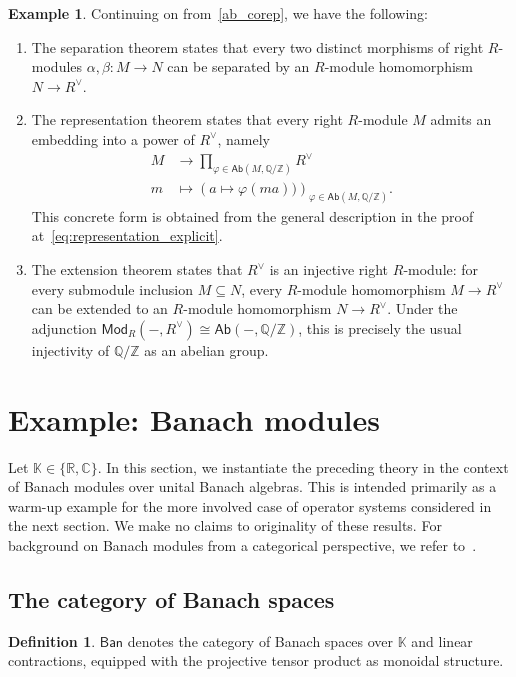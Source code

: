 \documentclass[11pt,onecolumn]{article}
\newcommand{\R}{\mathbb{R}}
\newcommand{\Z}{\mathbb{Z}}
\newcommand{\Q}{\mathbb{Q}}
\newcommand{\C}{\mathbb{C}}
\newcommand{\K}{\mathbb{K}}
\newcommand{\Ab}{\mathsf{Ab}}
\newcommand{\Ban}{\mathsf{Ban}}
\newcommand{\Mod}{\mathsf{Mod}}
\theoremstyle{plain}
\theoremstyle{remark}
\theoremstyle{definition}
\newtheorem{definition}[definition]{Definition}
\newtheorem{example}[example]{Example}
\begin{document}
\begin{example}
	Continuing on from~\cref{ab_corep}, we have the following:
	\begin{enumerate}
		\item The separation theorem states that every two distinct morphisms of right $R$-modules $\alpha, \beta \colon M \to N$ can be separated by an $R$-module homomorphism $N \to R^\vee$.
		\item The representation theorem states that every right $R$-module $M$ admits an embedding into a power of $R^\vee$, namely
			\begin{align*}
				M & \longrightarrow \prod_{\varphi \in \Ab(M,\Q/\Z)} R^\vee \\
				m & \longmapsto \left( a \mapsto \varphi(ma)) \right)_{\varphi \in \Ab(M,\Q/\Z)}.
			\end{align*}
			This concrete form is obtained from the general description in the proof at~\eqref{eq:representation_explicit}.
		\item The extension theorem states that $R^\vee$ is an injective right $R$-module:
			for every submodule inclusion $M \subseteq N$, every $R$-module homomorphism $M \to R^\vee$ can be extended to an $R$-module homomorphism $N \to R^\vee$.
			Under the adjunction $\Mod_R(-,R^\vee) \cong \Ab(-,\Q/\Z)$, this is precisely the usual injectivity of $\Q/\Z$ as an abelian group.
	\end{enumerate}
\end{example}

\section{Example: Banach modules}
\label{sec:banach_modules}

Let $\K \in \{\R,\C\}$.
In this section, we instantiate the preceding theory in the context of Banach modules over unital Banach algebras.
This is intended primarily as a warm-up example for the more involved case of operator systems considered in the next section.
We make no claims to originality of these results.
For background on Banach modules from a categorical perspective, we refer to~\cite{CiglerLosertMichor}.

\subsection{The category of Banach spaces}

\begin{definition}
	$\Ban$ denotes the category of Banach spaces over $\K$ and linear contractions, equipped with the projective tensor product as monoidal structure.
\end{definition}
\end{document}
